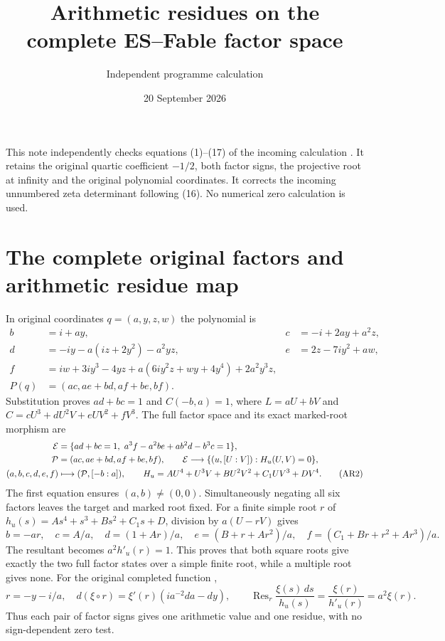 \documentclass[11pt]{article}
\title{Arithmetic residues on the complete ES--Fable factor space}
\author{Independent programme calculation}
\date{20 September 2026}
\newcommand{\Res}{\operatorname{Res}}
\begin{document}
\maketitle
This note independently checks equations (1)--(17) of the incoming
calculation \cite{Incoming}. It retains the original quartic
coefficient $-1/2$, both factor signs, the projective root at
infinity and the original polynomial coordinates. It corrects
the incoming unnumbered zeta determinant following (16).
No numerical zero calculation is used.

\section{The complete original factors and arithmetic residue map}
In original coordinates $q=(a,y,z,w)$ the polynomial is
\begin{align}
b&=i+ay,&c&=-i+2ay+a^2z,\nonumber\\
d&=-iy-a(iz+2y^2)-a^2yz,&e&=2z-7iy^2+aw,\nonumber\\
f&=iw+3iy^3-4yz+a(6iy^2z+wy+4y^4)+2a^2y^3z,\nonumber\\
P(q)&=(ac,ae+bd,af+be,bf). \tag{AR1}
\end{align}
Substitution proves $ad+bc=1$ and $C(-b,a)=1$, where
$L=aU+bV$ and $C=cU^3+dU^2V+eUV^2+fV^3$.
The full factor space and its exact marked-root morphism are
\begin{align}
{\cal E}&=\{ad+bc=1,\ a^3f-a^2be+ab^2d-b^3c=1\},\nonumber\\
{\cal P}&=(ac,ae+bd,af+be,bf),\qquad
{\cal E}\longrightarrow\{(u,[U:V]):H_u(U,V)=0\},\nonumber\\
(a,b,c,d,e,f)&\longmapsto({\cal P},[-b:a]),\qquad
H_u=AU^4+U^3V+BU^2V^2+C_1UV^3+DV^4.
\tag{AR2}
\end{align}
The first equation ensures $(a,b)\ne(0,0)$. Simultaneously
negating all six factors leaves the target and marked root fixed.
For a finite simple root $r$ of
$h_u(s)=As^4+s^3+Bs^2+C_1s+D$, division by $a(U-rV)$ gives
\[
b=-ar,\quad c=A/a,\quad d=(1+Ar)/a,\quad
e=(B+r+Ar^2)/a,\quad f=(C_1+Br+r^2+Ar^3)/a.
\]
The resultant becomes $a^2h'_u(r)=1$. This proves that both
square roots give exactly the two full factor states over a
simple finite root, while a multiple root gives none.
For the original completed function \cite{DLMFXi},
\begin{equation}
r=-y-i/a,\quad
d(\xi\circ r)=\xi'(r)(ia^{-2}da-dy),\qquad
\Res_r\frac{\xi(s)\,ds}{h_u(s)}
=\frac{\xi(r)}{h'_u(r)}=a^2\xi(r).
\tag{AR3}
\end{equation}
Thus each pair of factor signs gives one arithmetic value
and one residue, with no sign-dependent zero test.
\end{document}
